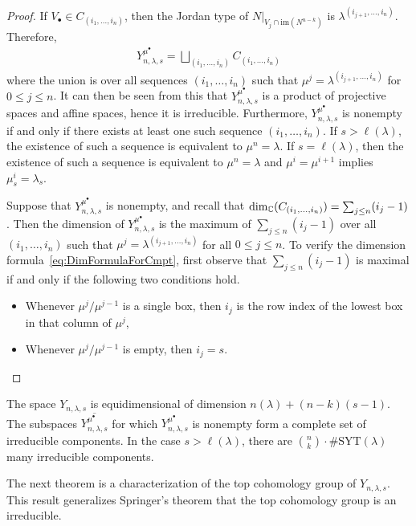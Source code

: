 \documentclass[12pt]{amsart}
\newcommand{\la}{\lambda}
\newcommand{\im}{\mathrm{im}}
\newcommand{\SYT}{\mathrm{SYT}}
\begin{document}
\begin{proof}
If $V_\bullet\in C_{(i_1,\dots, i_n)}$, then the Jordan type of $N|_{V_j\cap \im(N^{n-k})}$ is $\la^{(i_{j+1},\dots, i_n)}$. Therefore,
\begin{align}
Y_{n,\la,s}^{\mu^\bullet} = \bigsqcup_{(i_1,\dots, i_n)} C_{(i_1,\dots, i_n)}
\end{align}
where the union is over all sequences $(i_1,\dots, i_n)$ such that $\mu^{j} = \la^{(i_{j+1},\dots, i_n)}$ for $0\leq j \leq n$. It can then be seen from this that $Y_{n,\la,s}^{\mu^\bullet}$ is a product of projective spaces and affine spaces, hence it is irreducible. Furthermore, $Y_{n,\la,s}^{\mu^\bullet}$ is nonempty if and only if there exists at least one such sequence $(i_1,\dots, i_n)$. If $s>\ell(\la)$, the existence of such a sequence is equivalent to $\mu^n = \la$. If $s=\ell(\la)$, then the existence of such a sequence is equivalent to $\mu^n=\la$ and $\mu^i = \mu^{i+1}$ implies $\mu^i_s = \la_s$.

Suppose that $Y_{n,\la,s}^{\mu^\bullet}$ is nonempty, and recall that $\dim_{\mathbb{C}} (C_{(i_1,\dots, i_n)}) = \sum_{j\leq n} (i_j-1)$. Then the dimension of $Y_{n,\la,s}^{\mu^\bullet}$ is the maximum of $\sum_{j\leq n} (i_j-1)$ over all $(i_1,\dots, i_n)$ such that $\mu^{j} = \la^{(i_{j+1},\dots, i_n)}$ for all $0\leq j \leq n$. To verify the dimension formula~\eqref{eq:DimFormulaForCmpt}, first observe that $\sum_{j\leq n}(i_j-1)$ is maximal if and only if the following two conditions hold.
\begin{itemize}
\item Whenever $\mu^j/\mu^{j-1}$ is a single box, then $i_j$ is the row index of the lowest box in that column of $\mu^j$,
\item Whenever $\mu^j/\mu^{j-1}$ is empty, then $i_j = s$.
\end{itemize}

\end{proof}


\begin{theorem}
The space $Y_{n,\la,s}$ is equidimensional of dimension $n(\la) + (n-k)(s-1)$. The subspaces $\overline{Y_{n,\la,s}^{\mu^\bullet}}$ for which $Y_{n,\la,s}^{\mu^\bullet}$ is nonempty form a complete set of irreducible components. In the case $s>\ell(\la)$, there are $\binom{n}{k}\cdot \#\SYT(\la)$ many irreducible components.
\end{theorem}

The next theorem is a characterization of the top cohomology group of $Y_{n,\lambda,s}$. This result generalizes Springer's theorem that the top cohomology group is an irreducible.
 
\end{document}
